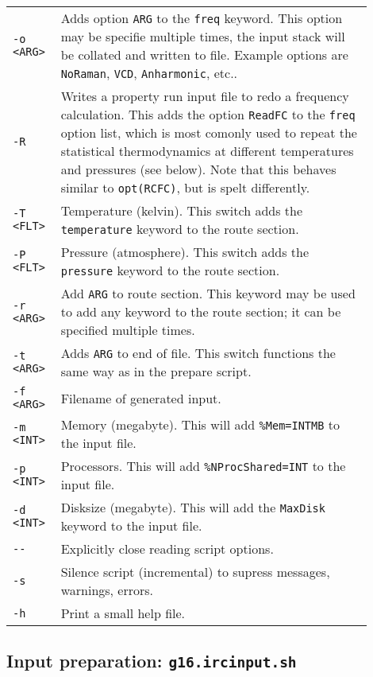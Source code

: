 \documentclass[   %
  final,          %
  a4paper         %
]{article}
\begin{document}
\begin{longtable}{p{0.1\linewidth}p{0.8\linewidth}}
  {\lstinline`-o <ARG>`} & Adds option {\lstinline`ARG`} to the \texttt{freq} keyword. 
    This option may be specifie multiple times, the input stack will be collated and written to file.
    Example options are \texttt{NoRaman}, \texttt{VCD}, \texttt{Anharmonic}, etc.. \\
  {\lstinline`-R`}       & Writes a property run input file to redo a frequency calculation.
    This adds the option \texttt{ReadFC} to the \texttt{freq} option list,
    which is most comonly used to repeat the statistical thermodynamics at
    different temperatures and pressures (see below). 
    Note that this behaves similar to \texttt{opt(RCFC)}, but is spelt differently. \\
  {\lstinline`-T <FLT>`} & Temperature (kelvin). This switch adds the \texttt{temperature} keyword to the route section. \\
  {\lstinline`-P <FLT>`} & Pressure (atmosphere). This switch adds the \texttt{pressure} keyword to the route section. \\
  {\lstinline`-r <ARG>`} & Add {\lstinline`ARG`} to route section. 
    This keyword may be used to add any keyword to the route section; 
    it can be specified multiple times.\\
  {\lstinline`-t <ARG>`} & Adds {\lstinline`ARG`} to end of file. 
    This switch functions the same way as in the prepare script. \\
  {\lstinline`-f <ARG>`} & Filename of generated input. \\
  {\lstinline`-m <INT>`} & Memory (megabyte). This will add \texttt{\%Mem={\lstinline`INT`}MB} to the input file. \\
  {\lstinline`-p <INT>`} & Processors. This will add \texttt{\%NProcShared={\lstinline`INT`}} to the input file. \\
  {\lstinline`-d <INT>`} & Disksize (megabyte). This will add the \texttt{MaxDisk} keyword to the input file. \\
  {\lstinline`--`}       & Explicitly close reading script options. \\
  {\lstinline`-s`}       & Silence script (incremental) to supress messages, warnings, errors. \\
  {\lstinline`-h`}       & Print a small help file. \\
\end{longtable}

\subsection{Input preparation: \texorpdfstring{{\lstinline`g16.ircinput.sh`}}{g16.ircinput.sh}}
\label{sec:g16.ircinput}
\end{document}
